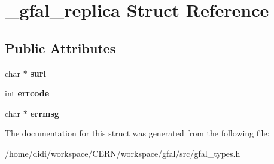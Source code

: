 \section{\_\-gfal\_\-replica Struct Reference}
\label{struct__gfal__replica}
\subsection*{Public Attributes}
\begin{DoxyCompactItemize}
\item 
char $\ast$ {\bfseries surl}\label{struct__gfal__replica_a7f9327dc1e2ccf8867b5389f85691f35}

\item 
int {\bfseries errcode}\label{struct__gfal__replica_a86871f387f5425f00fc81aa41556a5c5}

\item 
char $\ast$ {\bfseries errmsg}\label{struct__gfal__replica_a1fac13f84600c88aba251395a0ebe3ae}

\end{DoxyCompactItemize}


The documentation for this struct was generated from the following file:\begin{DoxyCompactItemize}
\item 
/home/didi/workspace/CERN/workspace/gfal/src/gfal\_\-types.h\end{DoxyCompactItemize}
